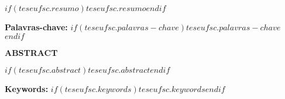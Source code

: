 \singlespacing
\justifying
\noindent 
$if(teseufsc.resumo)$$teseufsc.resumo$$endif$

\vspace{1em}

\noindent \textbf{Palavras-chave:} $if(teseufsc.palavras-chave)$$teseufsc.palavras-chave$$endif$ 

\newpage
\thispagestyle{empty}

\vspace*{0pt}
\begin{center}
  \textbf{ABSTRACT}
\end{center}

\singlespacing
\justifying
\noindent
$if(teseufsc.abstract)$$teseufsc.abstract$$endif$

\vspace{1em}

\noindent \textbf{Keywords:} $if(teseufsc.keywords)$$teseufsc.keywords$$endif$

\justifying